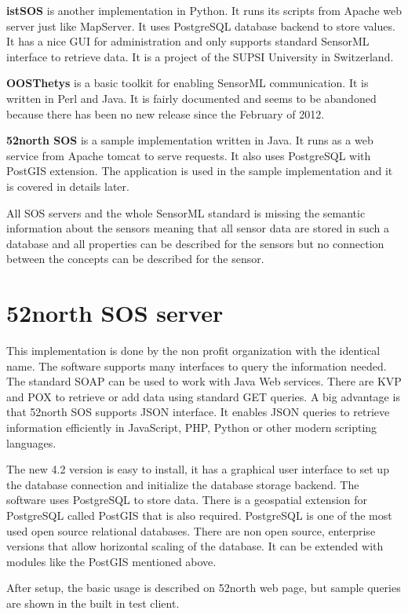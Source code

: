 \textbf{istSOS} is another implementation in Python\cite{istsos}. It runs its scripts from Apache web server just like MapServer. It uses PostgreSQL database backend to store values. It has a nice GUI for administration and only supports standard SensorML interface to retrieve data. It is a project of the SUPSI University in Switzerland.

\textbf{OOSThetys} is a basic toolkit for enabling SensorML communication. It is written in Perl and Java. It is fairly documented and seems to be abandoned because there has been no new release since the February of 2012.

\textbf{52north SOS} is a sample implementation written in Java\cite{52north}. It runs as a web service from Apache tomcat to serve requests. It also uses PostgreSQL with PostGIS extension. The application is used in the sample implementation and it is covered in details later.

All SOS servers and the whole SensorML standard is missing the semantic information about the sensors meaning that all sensor data are stored in such a database and all properties can be described for the sensors but no connection between the concepts can be described for the sensor.

\section{52north SOS server}

This implementation is done by the non profit organization with the identical name. The software supports many interfaces to query the information needed. The standard SOAP can be used to work with Java Web services. There are KVP and POX to retrieve or add data using standard GET queries. A big advantage is that 52north SOS supports JSON interface. It enables JSON queries to retrieve information efficiently in JavaScript, PHP, Python or other modern scripting languages.

The new 4.2 version is easy to install, it has a graphical user interface to set up the database connection and initialize the database storage backend. The software uses PostgreSQL to store data. There is a geospatial extension for PostgreSQL called PostGIS that is also required. PostgreSQL is one of the most used open source relational databases. There are non open source, enterprise versions that allow horizontal scaling of the database. It can be extended with modules like the PostGIS mentioned above.

After setup, the basic usage is described on 52north web page, but sample queries are shown in the built in test client. 

